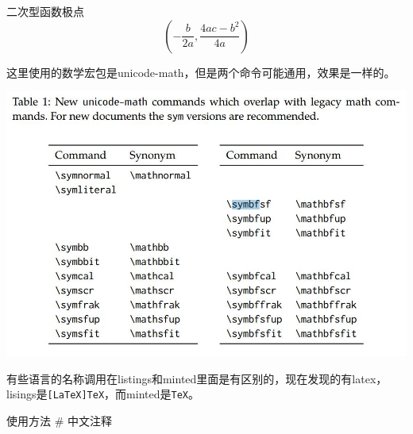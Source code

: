 \documentclass{lsbook}
\begin{document}
二次型函数极点
\[\left(-\frac{b}{2a},\frac{4ac-b^2}{4a}\right)\]

这里使用的数学宏包是unicode-math，但是两个命令可能通用，效果是一样的。

\includegraphics[width=0.7\linewidth]{unimath}


有些语言的名称调用在listings和minted里面是有区别的，现在发现的有latex，lisings是\verb|[LaTeX]TeX|，而minted是\verb|TeX|。

\begin{langCVOne}{使用方法}
 # 中文注释
\end{langCVOne}

\makebackcover
\end{document}
